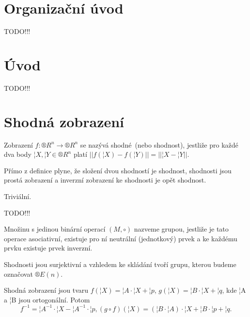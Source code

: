 \documentclass[12pt]{article}					%
\begin{document}

\section*{Organizační úvod}
	TODO!!!

\section*{Úvod}
	TODO!!!


\section{Shodná zobrazení}
\begin{definice}
	Zobrazení $f: ®R^n \rightarrow ®R^n$ se nazývá shodné (nebo shodnost), jestliže pro každé dva body $¦X, ¦Y \in ®R^n$ platí $||f(¦X) - f(¦Y)|| = ||¦X - ¦Y||$.
\end{definice}

\begin{lemma}
	Přímo z definice plyne, že složení dvou shodností je shodnost, shodnosti jsou prostá zobrazení a inverzní zobrazení ke shodnosti je opět shodnost.

	\begin{dukazin}
		Triviální.
	\end{dukazin}
\end{lemma}

TODO!!!

\begin{definice}[Grupa]
	Množinu s jedinou binární operací $(M, \circ)$ nazveme grupou, jestliže je tato operace asociativní, existuje pro ní neutrální (jednotkový) prvek a ke každému prvku existuje prvek inverzní.
\end{definice}

\begin{dusledek}
	Shodnosti jsou surjektivní a vzhledem ke skládání tvoří grupu, kterou budeme označovat $®E(n)$.

	\begin{dukazin}
		Shodná zobrazení jsou tvaru $f(¦X) = ¦A·¦X + ¦p$, $g(¦X) = ¦B·¦X + ¦q$, kde ¦A a ¦B jsou ortogonální. Potom
		$$ f^{-1} = ¦A^{-1}·¦X - ¦A^{-1}·¦p, (g \circ f)(¦X) = (¦B·¦A)·¦X + ¦B·¦p + ¦q. $$
	\end{dukazin}
\end{dusledek}
\end{document}
